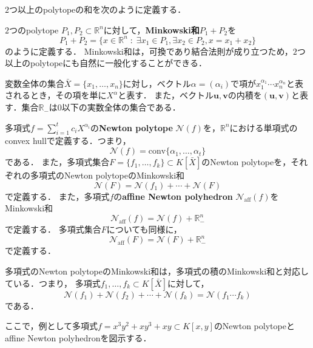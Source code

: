 $2$つ以上のpolytopeの和を次のように定義する．
\begin{definition}
	$2$つのpolytope $P_1, P_2 \subset \mathbb{R}^n$に対して，\textbf{Minkowski和}$P_1 + P_2$を
	$$P_1 + P_2 = \{ x \in \mathbb{R}^n \;:\; \exists x_1 \in P_1, \exists x_2 \in P_2, x = x_1 + x_2\}$$
	のように定義する．
	Minkowski和は，可換であり結合法則が成り立つため，$2$つ以上のpolytopeにも自然に一般化することができる．
\end{definition}
変数全体の集合$\bar{X} = \{x_1, \dots, x_n\}$に対し，ベクトル$\alpha = (\alpha_i)$で項が$x_1^{\alpha_1} \cdots x_n^{\alpha_n}$と表されるとき，その項を単に$X^{\alpha}$と表す．
また，ベクトル$\bm{u}, \bm{v}$の内積を$(\bm{u}, \bm{v})$と表す．集合$\mathbb{R}_{-}$は$0$以下の実数全体の集合である．
\begin{definition}
	多項式$\displaystyle f = \sum_{i=1}^t c_i X^{\alpha_i}$の\textbf{Newton polytope} $\mathcal{N}(f)$を，$\mathbb{R}^n$における単項式のconvex hullで定義する．つまり，
	$$\mathcal{N}(f) = \mathrm{conv}\{\alpha_1, \dots, \alpha_t\}$$
	である．
	また，多項式集合$F = \{f_1, \dots, f_k\} \subset K[\bar{X}]$のNewton polytopeを，それぞれの多項式のNewton polytopeのMinkowski和
	$$\mathcal{N}(F) = \mathcal{N}(f_1) + \cdots + \mathcal{N}(F)$$
	で定義する．
	また，多項式$f$の\textbf{affine Newton polyhedron} $\mathcal{N}_{\mathrm{aff}}(f)$をMinkowski和
	$$\mathcal{N}_{\mathrm{aff}}(f) = \mathcal{N}(f) + \mathbb{R}_{-}^n$$
	で定義する．
	多項式集合$F$についても同様に，$$\mathcal{N}_{\mathrm{aff}}(F) = \mathcal{N}(F) + \mathbb{R}_{-}^n$$で定義する．
\end{definition}

\begin{remark*}
	多項式のNewton polytopeのMinkowski和は，多項式の積のMinkowski和と対応している．つまり，
	多項式$f_1, \dots, f_k \subset K[\bar{X}]$に対して，
	$$\mathcal{N}(f_1) + \mathcal{N}(f_2) + \cdots + \mathcal{N}(f_k) = \mathcal{N}(f_1 \cdots f_k)$$
	である．
\end{remark*}

ここで，例として多項式$f = x^3y^2 + xy^3 + xy \subset K[x, y]$のNewton polytopeとaffine Newton polyhedronを図示する．
\\

